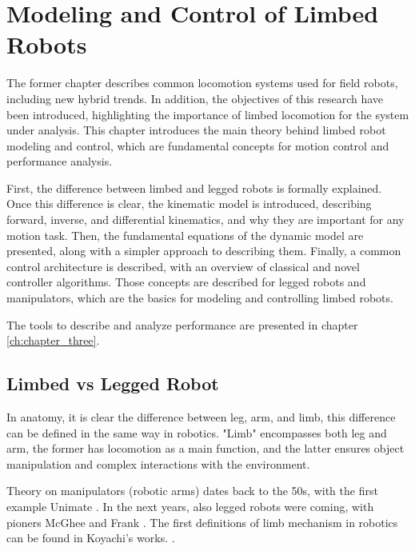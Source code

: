 \chapter{Modeling and Control of Limbed Robots}
\label{ch:chapter_two}%

The former chapter describes common locomotion systems used for field robots, including new hybrid trends. In addition, the objectives of this research have been introduced, highlighting the importance of limbed locomotion for the system under analysis.
This chapter introduces the main theory behind limbed robot modeling and control, which are fundamental concepts for motion control and performance analysis. 

First, the difference between limbed and legged robots is formally explained.
Once this difference is clear, the kinematic model is introduced, describing forward, inverse, and differential kinematics, and why they are important for any motion task. 
Then, the fundamental equations of the dynamic model are presented, along with a simpler approach to describing them. 
Finally, a common control architecture is described, with an overview of classical and novel controller algorithms.
Those concepts are described for legged robots and manipulators, which are the basics for modeling and controlling limbed robots.  

The tools to describe and analyze performance are presented in chapter \ref{ch:chapter_three}.


\section{Limbed vs Legged Robot}
\label{sec:limbvsleg}

In anatomy, it is clear the difference between leg, arm, and limb, this difference can be defined in the same way in robotics.
"Limb" encompasses both leg and arm, the former has locomotion as a main function, and the latter ensures object manipulation and complex interactions with the environment. 

Theory on manipulators (robotic arms) dates back to the 50s, with the first example Unimate \cite{unimate}. In the next years, also legged robots were coming, with pioners McGhee and Frank \cite{McGhee}. 
The first definitions of limb mechanism in robotics can be found in Koyachi's works. \cite{Koyachi}\cite{Koyachi2}\cite{Koyachi3}.\newline

